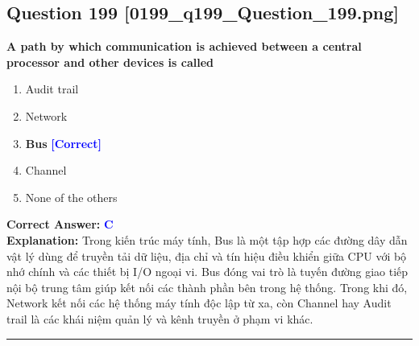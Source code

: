 \documentclass[11pt,a4paper]{article}
\begin{document}
\begin{minipage}{\textwidth}
\subsection*{Question 199 \quad \footnotesize{[0199\_q199\_Question\_199.png]}}
\noindent \textbf{A path by which communication is achieved between a central processor and other devices is called}

\begin{enumerate}[label=\Alph*.]
    \item Audit trail
    \item Network
    \item \textbf{Bus} \hfill \textcolor{blue}{\textbf{[Correct]}}
    \item Channel
    \item None of the others
\end{enumerate}

\noindent \textbf{Correct Answer:} \textcolor{blue}{\textbf{C}} \\[2pt]
\noindent \textbf{Explanation:} Trong kiến trúc máy tính, Bus là một tập hợp các đường dây dẫn vật lý dùng để truyền tải dữ liệu, địa chỉ và tín hiệu điều khiển giữa CPU với bộ nhớ chính và các thiết bị I/O ngoại vi. Bus đóng vai trò là tuyến đường giao tiếp nội bộ trung tâm giúp kết nối các thành phần bên trong hệ thống. Trong khi đó, Network kết nối các hệ thống máy tính độc lập từ xa, còn Channel hay Audit trail là các khái niệm quản lý và kênh truyền ở phạm vi khác.

\par\vspace{0.3cm}
\hrule
\vspace{0.3cm}
\end{minipage}
\end{document}
